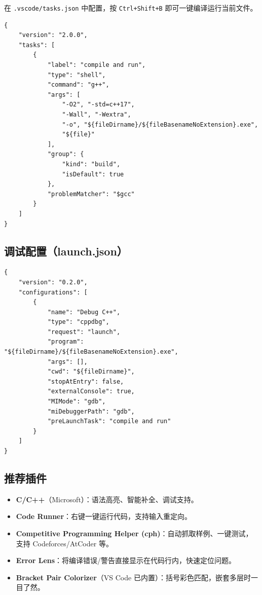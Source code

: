 \documentclass[UTF8,openany,oneside,zihao=-4]{ctexbook}
\begin{document}
\begin{note}
在 \lstinline|.vscode/tasks.json| 中配置，按 \lstinline|Ctrl+Shift+B| 即可一键编译运行当前文件。
\end{note}

\begin{lstlisting}
{
    "version": "2.0.0",
    "tasks": [
        {
            "label": "compile and run",
            "type": "shell",
            "command": "g++",
            "args": [
                "-O2", "-std=c++17",
                "-Wall", "-Wextra",
                "-o", "${fileDirname}/${fileBasenameNoExtension}.exe",
                "${file}"
            ],
            "group": {
                "kind": "build",
                "isDefault": true
            },
            "problemMatcher": "$gcc"
        }
    ]
}
\end{lstlisting}

\subsection{调试配置（launch.json）}

\begin{lstlisting}
{
    "version": "0.2.0",
    "configurations": [
        {
            "name": "Debug C++",
            "type": "cppdbg",
            "request": "launch",
            "program": "${fileDirname}/${fileBasenameNoExtension}.exe",
            "args": [],
            "cwd": "${fileDirname}",
            "stopAtEntry": false,
            "externalConsole": true,
            "MIMode": "gdb",
            "miDebuggerPath": "gdb",
            "preLaunchTask": "compile and run"
        }
    ]
}
\end{lstlisting}

\subsection{推荐插件}

\begin{note}
\begin{itemize}
  \item \textbf{C/C++}（Microsoft）：语法高亮、智能补全、调试支持。
  \item \textbf{Code Runner}：右键一键运行代码，支持输入重定向。
  \item \textbf{Competitive Programming Helper (cph)}：自动抓取样例、一键测试，支持 Codeforces/AtCoder 等。
  \item \textbf{Error Lens}：将编译错误/警告直接显示在代码行内，快速定位问题。
  \item \textbf{Bracket Pair Colorizer}（VS Code 已内置）：括号彩色匹配，嵌套多层时一目了然。
\end{itemize}
\end{note}
\end{document}
